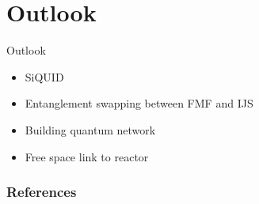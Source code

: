 \documentclass[serif,8pt]{beamer}
\begin{document}
\section{Outlook}
\begin{frame}{Outlook}
	\begin{itemize}
		\item SiQUID
		\item Entanglement swapping between FMF and IJS
		\item Building quantum network
		\item Free space link to reactor
	\end{itemize}
\end{frame}

\addtocounter{framenumber}{-1}
\begin{frame}
	\frametitle{References}
	\tiny
	
	
\end{frame}
\end{document}

